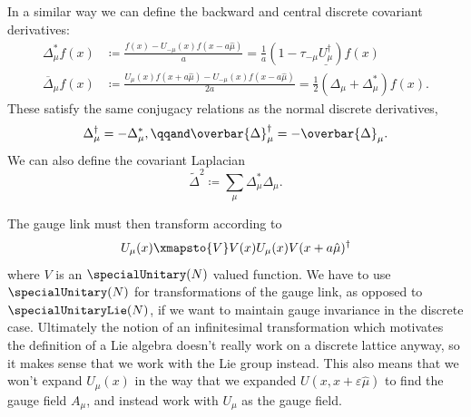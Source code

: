 \documentclass[fleqn]{NotesClass}
\newcommand{\hermit}{\dagger}
\newcommand{\multiplicative}[1]{\underline{#1}}
\newcommand{\forwardGaugeDerivative}{\Delta}
\newcommand{\backwardGaugeDerivative}{\Delta^*}
\newcommand{\centralGaugeDerivative}{\overbar{\Delta}}
\newcommand{\mixedLaplacianGauge}{\tilde{\Delta}^2}
\begin{document}
    In a similar way we can define the backward and central discrete covariant derivatives:
    \begin{align}
        \backwardGaugeDerivative_\mu f(x) &\coloneqq \frac{f(x) - U_{-\mu}(x)f(x - a\hat{\mu})}{a} = \frac{1}{a}(1 - \tau_{-\mu}\multiplicative{U_\mu^\hermit})f(x)\\
        \centralGaugeDerivative_\mu f(x) &\coloneqq \frac{U_\mu(x) f(x + a\hat{\mu}) - U_{-\mu}(x)f(x - a\hat{\mu})}{2a} = \frac{1}{2}(\forwardGaugeDerivative_\mu + \backwardGaugeDerivative_\mu)f(x).
    \end{align}
    These satisfy the same conjugacy relations as the normal discrete derivatives,
    \begin{equation}
        \forwardGaugeDerivative_\mu^\hermit = -\backwardGaugeDerivative_\mu, \qqand \centralGaugeDerivative_\mu^\hermit = -\centralGaugeDerivative_\mu.
    \end{equation}
    We can also define the covariant Laplacian
    \begin{equation}
        \mixedLaplacianGauge \coloneqq \sum_\mu \backwardGaugeDerivative_\mu \forwardGaugeDerivative_\mu.
    \end{equation}
    
    The gauge link must then transform according to
    \begin{equation}\label{eqn:gauge link transformation}
        U_\mu(x) \xmapsto{V} V(x) U_\mu(x) V(x + a\hat{\mu})^\hermit
    \end{equation}
    where \(V\) is an \(\specialUnitary(N)\) valued function.
    We have to use \(\specialUnitary(N)\) for transformations of the gauge link, as opposed to \(\specialUnitaryLie(N)\), if we want to maintain gauge invariance in the discrete case.
    Ultimately the notion of an infinitesimal transformation which motivates the definition of a Lie algebra doesn't really work on a discrete lattice anyway, so it makes sense that we work with the Lie group instead.
    This also means that we won't expand \(U_\mu(x)\) in the way that we expanded \(U(x, x + \varepsilon\hat{\mu})\) to find the gauge field \(A_\mu\), and instead work with \(U_\mu\) as the gauge field.
    
\end{document}

